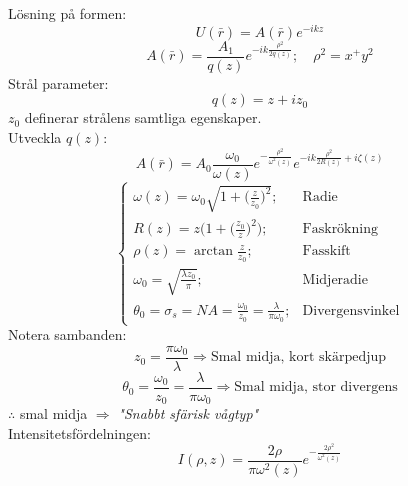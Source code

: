 \documentclass{article}
\begin{document}
    Lösning på formen:
    \[
      U(\bar{r})=A(\bar{r})e^{-ikz}
    \]
    \[
      A(\bar{r})=\frac{A_1}{q(z)}e^{-ik\frac{\rho^2}{2q(z)}};\quad\rho^2=x^+y^2
    \]
    Strål parameter:
    \[
      q(z)=z+iz_0
    \]
    $z_0$ definerar strålens samtliga egenskaper. \\

    Utveckla $q(z)$:
    \[
      A(\bar{r})=A_0\frac{\omega_0}{\omega(z)}e^{-\frac{\rho^2}{\omega^2(z)}}e^{-ik\frac{\rho^2}{2R(z)}+i\zeta(z)}
    \]
    \[\begin{cases}
      \omega(z)=\omega_0\sqrt{1+\big(\frac{z}{z_0}\big)^2};&\text{Radie}\\
      R(z)=z\bigg(1+\big(\frac{z_0}{z}\big)^2\bigg);&\text{Faskrökning}\\
      \rho(z)=\arctan{\frac{z}{z_0}};&\text{Fasskift}\\
      \omega_0=\sqrt{\frac{\lambda z_0}{\pi}};&\text{Midjeradie}\\
      \theta_0=\sigma_s=NA=\frac{\omega_0}{z_0}=\frac{\lambda}{\pi\omega_0};&\text{Divergensvinkel}
    \end{cases}\]
    Notera sambanden:
    \[
      z_0=\frac{\pi\omega_0}{\lambda}\Rightarrow\text{Smal midja, kort skärpedjup}
    \]
    \[
      \theta_0=\frac{\omega_0}{z_0}=\frac{\lambda}{\pi\omega_0}\Rightarrow\text{Smal midja, stor divergens}
    \]
    $\therefore$ smal midja $\Rightarrow$ \textit{"Snabbt sfärisk vågtyp"}\\

    Intensitetsfördelningen:
    \[
      I(\rho,z)=\frac{2\rho}{\pi\omega^2(z)}e^{-\frac{2\rho^2}{\omega^2(z)}}
    \]
\end{document}
